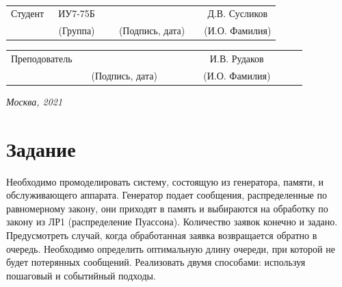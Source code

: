 \documentclass[14pt, a4paper]{extarticle}
\begin{document}
\noindent
{}

\noindent
{}
\\

\vspace{1.5cm}
\noindent
\begin{tabular}{l c c c c c}
	Студент      & ~ИУ7-75Б~               & \hspace{2.5cm} & \hspace{2cm}                 & &  Д.В. Сусликов \\\cline{2-2}\cline{4-4} \cline{6-6} 
	\hspace{3cm} & {\footnotesize(Группа)} &                & {\footnotesize(Подпись, дата)} & & {\footnotesize(И.О. Фамилия)}
\end{tabular}

\noindent
\begin{tabular}{l c c c c}
	Преподователь & \hspace{5cm}   & \hspace{2cm}                 & & ~~~~~~~И.В. Рудаков~~~~~~~\\\cline{3-3} \cline{5-5} 
	\hspace{3cm}  &                & {\footnotesize(Подпись, дата)} & & {\footnotesize(И.О. Фамилия)}
\end{tabular}

\vspace{0.6cm}
\begin{center}	
	\vfill
	\large \textit {Москва, 2021}
\end{center}

\thispagestyle {empty}
\pagebreak

\clearpage
\section*{Задание}
Необходимо промоделировать систему, состоящую из генератора, памяти, и обслуживающего аппарата. Генератор подает сообщения, распределенные по равномерному закону, они приходят в память и выбираются на обработку по закону из ЛР1 (распределение Пуассона). Количество заявок конечно и задано. Предусмотреть случай, когда обработанная заявка возвращается обратно в очередь. Необходимо определить оптимальную длину очереди, при которой не будет потерянных сообщений. Реализовать двумя способами: используя пошаговый и событийный подходы.
\end{document}
